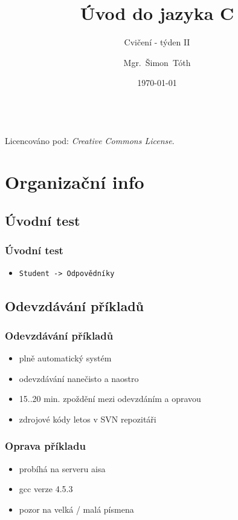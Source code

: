 

\title{Úvod do jazyka C}
\subtitle{Cvičení - týden II}
\author[]{Mgr.~Šimon~Tóth}
\date{\today}

\newcommand{\CcNote}[1]{%
        Licencováno pod: \textit{Creative Commons #1 3.0 License}.%
}


	\begin{frame}
		\titlepage
		\vfill
		\begin{center}
			\\
			{\tiny\CcNote{\CcLongnameByNcSa}}
			\vspace*{2ex}
		\end{center}
	\end{frame}

\section{Organizační info}
\subsection{Úvodní test}

\begin{frame}
	\frametitle{Úvodní test}
	\begin{itemize}
		\item{\texttt{Student -> Odpovědníky}}
	\end{itemize}
\end{frame}

\subsection{Odevzdávání příkladů}

\begin{frame}
	\frametitle{Odevzdávání příkladů}
	\begin{itemize}
		\item{plně automatický systém}
		\item{odevzdávání nanečisto a naostro}
		\item{15..20 min. zpoždění mezi odevzdáním a opravou}
		\item{zdrojové kódy letos v SVN repozitáři}
	\end{itemize}
\end{frame}

\begin{frame}
	\frametitle{Oprava příkladu}
	\begin{itemize}
		\item{probíhá na serveru aisa}
		\item{gcc verze 4.5.3}
		\item{pozor na velká / malá písmena}
	\end{itemize}
\end{frame}

